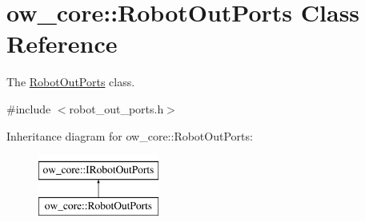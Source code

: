 \hypertarget{classow__core_1_1RobotOutPorts}{}\section{ow\+\_\+core\+:\+:Robot\+Out\+Ports Class Reference}
\label{classow__core_1_1RobotOutPorts}


The \hyperlink{classow__core_1_1RobotOutPorts}{Robot\+Out\+Ports} class.  




{\ttfamily \#include $<$robot\+\_\+out\+\_\+ports.\+h$>$}

Inheritance diagram for ow\+\_\+core\+:\+:Robot\+Out\+Ports\+:\begin{figure}[H]
\begin{center}
\leavevmode
\includegraphics[height=2.000000cm]{d4/d2e/classow__core_1_1RobotOutPorts}
\end{center}
\end{figure}
